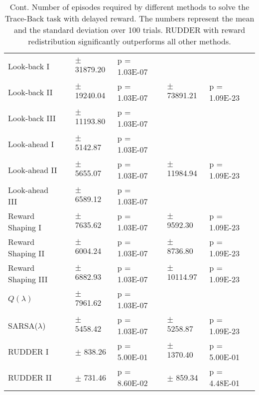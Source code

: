 \documentclass{article}
\begin{document}
\begin{appendices}
\begin{landscape}
\begin{table}[htp]
\begin{center}
\caption{Cont. Number of episodes required by different 
 methods to solve the Trace-Back task with delayed reward. The numbers represent the  
 mean and the standard deviation over 100 trials.
 RUDDER with reward redistribution significantly outperforms all other methods.
}
\label{tab:Ares2}\begin{tabular}{*{1}{>{\raggedright}p{14em}}*{1}{>{\columncolor{mColor1}\raggedleft}p{4em}}*{1}{>{\columncolor{mColor1}\raggedleft}p{5em}}*{1}{>{\columncolor{mColor1}\raggedright}p{5em}}*{1}{>{\raggedleft}p{4em}}*{1}{>{\raggedleft}p{5em}}*{1}{>{\raggedright}p{5em}}*{1}{>{\raggedright}p{0.01em}}}
\toprule[1pt]
\addlinespace[2pt]
{\bf Method} &\multicolumn{3}{c}{\bf Delay 20} &\multicolumn{3}{c}{\bf Delay 25} &\\
\toprule[1pt]
Look-back I & 113873.30 & {\small $\pm$ 31879.20} & {\small p = 1.03E-07} &  &  &  &  \\
Look-back II & 56830.30 & {\small $\pm$ 19240.04} & {\small p = 1.03E-07} & 111693.34 & {\small $\pm$ 73891.21} & {\small p = 1.09E-23} &  \\
Look-back III & 35852.10 & {\small $\pm$ 11193.80} & {\small p = 1.03E-07} &  &  &  &  \\
Look-ahead I & 187486.50 & {\small $\pm$ 5142.87} & {\small p = 1.03E-07} &  &  &  &  \\
Look-ahead II & 181974.30 & {\small $\pm$ 5655.07} & {\small p = 1.03E-07} & 289782.08 & {\small $\pm$ 11984.94} & {\small p = 1.09E-23} &  \\
Look-ahead III & 210029.90 & {\small $\pm$ 6589.12} & {\small p = 1.03E-07} &  &  &  &  \\
Reward Shaping I & 189870.30 & {\small $\pm$ 7635.62} & {\small p = 1.03E-07} & 297993.28 & {\small $\pm$ 9592.30} & {\small p = 1.09E-23} &  \\
Reward Shaping II & 170455.30 & {\small $\pm$ 6004.24} & {\small p = 1.03E-07} & 274312.10 & {\small $\pm$ 8736.80} & {\small p = 1.09E-23} &  \\
Reward Shaping III & 183592.60 & {\small $\pm$ 6882.93} & {\small p = 1.03E-07} & 291810.28 & {\small $\pm$ 10114.97} & {\small p = 1.09E-23} &  \\
$Q(\lambda)$ & 186874.40 & {\small $\pm$ 7961.62} & {\small p = 1.03E-07} &  &  &  &  \\
SARSA($\lambda$) & 273060.70 & {\small $\pm$ 5458.42} & {\small p = 1.03E-07} & 454031.36 & {\small $\pm$ 5258.87} & {\small p = 1.09E-23} &  \\
RUDDER I & 1048.97 & {\small $\pm$ 838.26} & {\small p = 5.00E-01} & 1236.57 & {\small $\pm$ 1370.40} & {\small p = 5.00E-01} &  \\
RUDDER II & 1159.30 & {\small $\pm$ 731.46} & {\small p = 8.60E-02} & 1195.75 & {\small $\pm$ 859.34} & {\small p = 4.48E-01} &  \\
\end{tabular}



\end{center}
\end{table}
\end{landscape}
\end{appendices}
\end{document}
